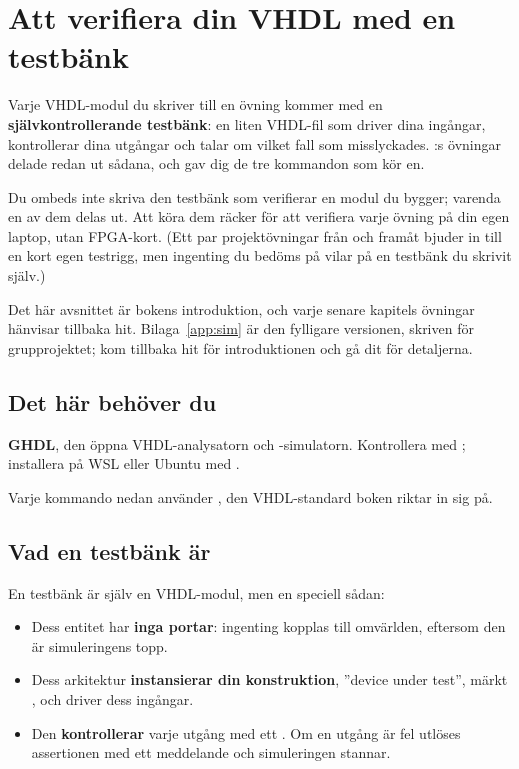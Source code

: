 
\section{Att verifiera din VHDL med en testbänk}
\label{c2:sec:testbenches}

Varje VHDL-modul du skriver till en övning kommer med en \textbf{självkontrollerande testbänk}: en
liten VHDL-fil som driver dina ingångar, kontrollerar dina utgångar och talar om vilket fall som
misslyckades. :s övningar delade redan ut sådana, och  gav dig
de tre kommandon som kör en.

Du ombeds inte skriva den testbänk som verifierar en modul du bygger; varenda en av dem delas ut.
Att köra dem räcker för att verifiera varje övning på din egen laptop, utan FPGA-kort. (Ett par
projektövningar från  och framåt bjuder in till en kort egen testrigg, men
ingenting du bedöms på vilar på en testbänk du skrivit själv.)

Det här avsnittet är bokens introduktion, och varje senare kapitels övningar hänvisar tillbaka
hit. Bilaga~\ref{app:sim} är den fylligare versionen, skriven för grupprojektet; kom tillbaka hit
för introduktionen och gå dit för detaljerna.

\subsection{Det här behöver du}
\label{c2:sub:need}
\textbf{GHDL}, den öppna VHDL-analysatorn och -simulatorn. Kontrollera med ;
installera på WSL eller Ubuntu med .

Varje kommando nedan använder , den VHDL-standard boken riktar in sig på.

\subsection{Vad en testbänk är}
\label{c2:sub:what}
En testbänk är själv en VHDL-modul, men en speciell sådan:
\begin{itemize}
  \item Dess entitet har \textbf{inga portar}: ingenting kopplas till omvärlden, eftersom den är
    simuleringens topp.
  \item Dess arkitektur \textbf{instansierar din konstruktion}, ”device under test”, märkt
    , och driver dess ingångar.
  \item Den \textbf{kontrollerar} varje utgång med ett . Om en utgång är fel utlöses
    assertionen med ett meddelande och simuleringen stannar.
\end{itemize}

